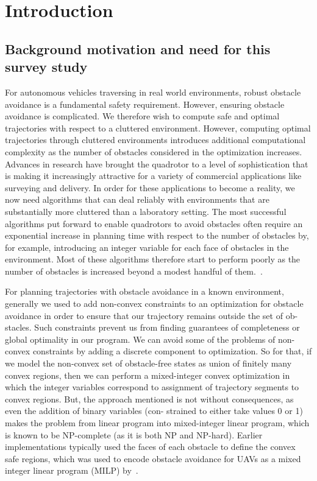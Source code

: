 \chapter{Introduction}




\section{Background motivation and need for this survey study}


For autonomous vehicles traversing in real world environments, robust obstacle avoidance is a fundamental safety requirement. However, ensuring obstacle avoidance is complicated. We therefore wish to compute safe and optimal trajectories with respect to a cluttered environment. However, computing optimal trajectories through cluttered environments introduces additional computational complexity as the number of obstacles considered in the optimization increases. Advances in research have brought the quadrotor to a level of sophistication that is making it increasingly attractive
for a variety of commercial applications like surveying and delivery. In order for these applications to become a reality, we now need algorithms that can deal reliably with environments that are substantially more cluttered than a laboratory setting. The most successful algorithms put forward to enable quadrotors to avoid obstacles often require an exponential
increase in planning time with respect to the number of obstacles by, for example, introducing an integer variable for each face of obstacles in the environment. Most of these algorithms therefore start to perform poorly as the number of obstacles is increased beyond a modest handful of them.~\cite{mellinger2012mixed,schouwenaars2001mixed}.

For planning trajectories with obstacle avoidance in a
known environment, generally we used to add non-convex
constraints to an optimization for obstacle avoidance in order
to ensure that our trajectory remains outside the set of ob-
stacles. Such constraints prevent us from finding guarantees
of completeness or global optimality in our program. We
can avoid some of the problems of non-convex constraints
by adding a discrete component to optimization. So for that,
if we model the non-convex set of obstacle-free states as
union of finitely many convex regions, then we can perform
a mixed-integer convex optimization in which the integer
variables correspond to assignment of trajectory segments to
convex regions. But, the approach mentioned is not without
consequences, as even the addition of binary variables (con-
strained to either take values 0 or 1) makes the problem from
linear program into mixed-integer linear program, which is
known to be NP-complete (as it is both NP and NP-hard).
Earlier implementations typically used the faces of each
obstacle to define the convex safe regions, which was used
to encode obstacle avoidance for UAVs as a mixed integer
linear program (MILP) by~\cite{schouwenaars2001mixed,culligan2006online,hao2005differential,richardsco}.

